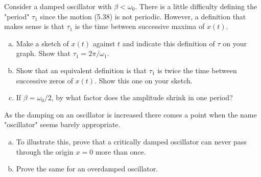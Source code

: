 \documentclass[11pt,letterpaper,boxed]{../hmcpsetrhino}
\begin{document}
\newpage 

\begin{problem}[5.25]
Consider a damped oscillator with $\beta < \omega_0$. There is a little difficulty defining the "period" $\tau_1$ since the motion (5.38) is not periodic. However, a definition that makes sense is that $\tau_1$ is the time between successive maxima of $x(t)$. 
\begin{enumerate}[(a)]
\item Make a sketch of $x(t)$ against $t$ and indicate this definition of $\tau$ on your graph. Show that $\tau_1 = 2 \pi / \omega_1$.

\item Show that an equivalent definition is that $\tau_1$ is twice the time between successive zeros of $x(t)$. Show this one on your sketch. 

\item If $\beta = \omega_0/2$, by what factor does the amplitude shrink in one period?

\end{enumerate}
\end{problem}
\begin{solution}


\vfill
\end{solution}

\newpage 


\begin{problem}[5.27]
As the damping on an oscillator is increased there comes a point when the name "oscillator" seems barely appropriate. 
\begin{enumerate}[(a)]
\item To illustrate this, prove that a critically damped oscillator can never pass through the origin $x=0$ more than once.

\item Prove the same for an overdamped oscillator.

\end{enumerate}
\end{problem}
\begin{solution}


\vfill
\end{solution}
\end{document}
